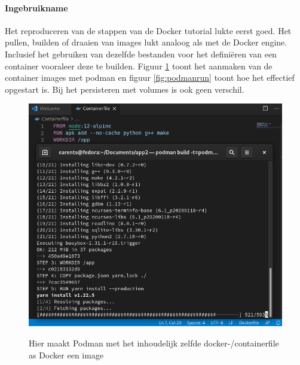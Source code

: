 \paragraph{Ingebruikname}
Het reproduceren van de stappen van de Docker tutorial lukte eerst goed.  Het pullen, builden of draaien van images lukt analoog als met de Docker engine. Inclusief het gebruiken van dezelfde bestanden voor het definiëren van een container vooraleer deze te builden. Figuur \ref{fig:podmanbuild} toont het aanmaken van de container images met podman en figuur \ref{fig:podmanrun} toont hoe het effectief opgestart is.  Bij het persisteren met volumes is ook geen verschil.
\begin{figure}[h]
    \includegraphics[width=\linewidth]{img/podmanbuild.png}
    \label{fig:podmanbuild}
    \caption[Een dockerfile in VS code om met podman te builden]{Hier maakt Podman met het inhoudelijk zelfde docker-/containerfile as Docker een image}
    \centering
\end{figure}
